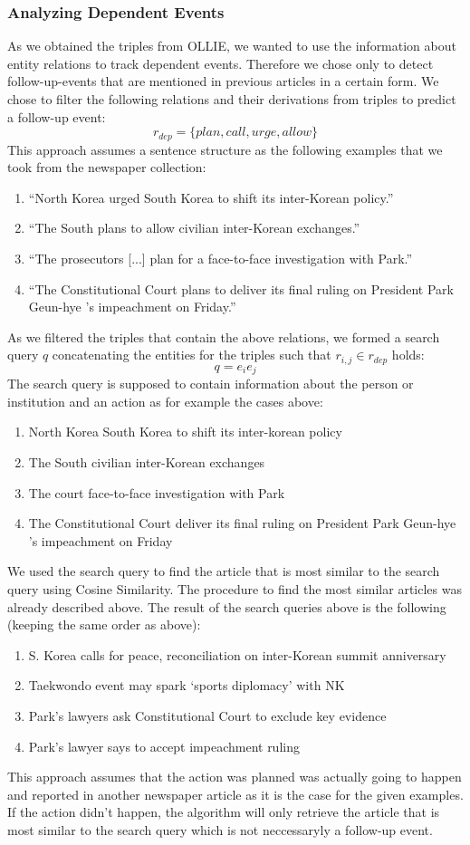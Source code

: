 \subsubsection{Analyzing Dependent Events}
As we obtained the triples from OLLIE, we wanted to use the information about entity relations to track dependent events. Therefore we chose only to detect follow-up-events that are mentioned in previous articles in a certain form. We chose to filter the following relations and their derivations from triples to predict a follow-up event:
$$r_{dep} = \{plan, call, urge, allow\}$$
This approach assumes a sentence structure as the following examples that we took from the newspaper collection:
\begin{enumerate}
	\item \enquote{North Korea urged South Korea to shift its inter-Korean policy.}
	\item \enquote{The South plans to allow civilian inter-Korean exchanges.}
	\item \enquote{The prosecutors [...] plan for a face-to-face investigation with Park.}
	\item \enquote{The Constitutional Court plans to deliver its final ruling on President Park Geun-hye 's impeachment on Friday.}
\end{enumerate}
As we filtered the triples that contain the above relations, we formed a search query $q$ concatenating the entities for the triples such that $r_{i,j} \in r_{dep}$ holds:
$$q = e_i e_j$$
The search query is supposed to contain information about the person or institution and an action as for example the cases above:
\begin{enumerate}
	\item North Korea South Korea to shift its inter-korean policy
	\item The South civilian inter-Korean exchanges
	\item The court face-to-face investigation with Park
	\item The Constitutional Court deliver its final ruling on President Park Geun-hye 's impeachment on Friday
\end{enumerate}
We used the search query to find the article that is most similar to the search query using Cosine Similarity. The procedure to find the most similar articles was already described above. The result of the search queries above is the following (keeping the same order as above):
\begin{enumerate}
	\item S. Korea calls for peace, reconciliation on inter-Korean summit anniversary
	\item Taekwondo event may spark ‘sports diplomacy’ with NK
	\item Park's lawyers ask Constitutional Court to exclude key evidence
	\item Park's lawyer says to accept impeachment ruling
\end{enumerate}
This approach assumes that the action was planned was actually going to happen and reported in another newspaper article as it is the case for the given examples. If the action didn't happen, the algorithm will only retrieve the article that is most similar to the search query which is not neccessaryly a follow-up event.

